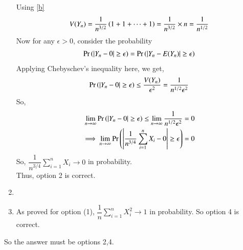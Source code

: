 \documentclass[journal,12pt,twocolumn]{IEEEtran}
\begin{document}
\begin{enumerate}
        Using \eqref{b}
        \begin{align}
            V(Y_n)=\dfrac{1}{n^{3/2}}\left(1+1+ \dots +1\right)=\dfrac{1}{n^{3/2}}\times n=\dfrac{1}{n^{1/2}}
        \end{align}
        Now for any $\epsilon>0$, consider the probability
        \begin{align}
            \Pr\left(|Y_n-0|\geq \epsilon\right)=\Pr\left(|Y_n-E(Y_n)|\geq \epsilon\right)
        \end{align}
        Applying Chebyschev's inequality here, we get,
        \begin{align}
            \Pr\left(|Y_n-0|\geq \epsilon\right) \leq \dfrac{V(Y_n)}{\epsilon^2} = \dfrac{1}{n^{1/2}\epsilon^2}
        \end{align}
        So,
        \begin{align}
            \lim_{n \to \infty}\Pr\left(|Y_n-0|\geq \epsilon\right) \leq \lim_{n \to \infty }\dfrac{1}{n^{1/2}\epsilon^2}=0\\
            \implies \lim_{n \to \infty}\Pr\left(\left | \dfrac{1}{n^{3/4}}\sum_{i=1}^nX_i - 0 \right|\geq \epsilon\right)=0
        \end{align}
        So, $\dfrac{1}{n^{3/4}}\sum_{i=1}^nX_i \to 0$ in probability.\\
        Thus, option 2 is correct.
    \item
    \item
        As proved for option (1), $\dfrac{1}{n}\sum_{i=1}^nX_i^2 \to 1$ in probability.
        So option 4 is correct.
\end{enumerate}
So the answer must be options 2,4.
\end{document}
